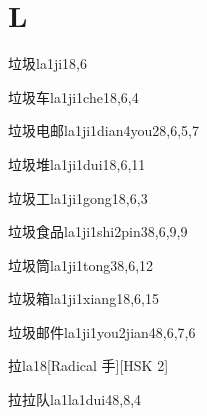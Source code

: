 
\section*{L}

\begin{entry}{垃圾}{la1ji1}{8,6}
\end{entry}

\begin{entry}{垃圾车}{la1ji1che1}{8,6,4}
\end{entry}

\begin{entry}{垃圾电邮}{la1ji1dian4you2}{8,6,5,7}
\end{entry}

\begin{entry}{垃圾堆}{la1ji1dui1}{8,6,11}
\end{entry}

\begin{entry}{垃圾工}{la1ji1gong1}{8,6,3}
\end{entry}

\begin{entry}{垃圾食品}{la1ji1shi2pin3}{8,6,9,9}
\end{entry}

\begin{entry}{垃圾筒}{la1ji1tong3}{8,6,12}
\end{entry}

\begin{entry}{垃圾箱}{la1ji1xiang1}{8,6,15}
\end{entry}

\begin{entry}{垃圾邮件}{la1ji1you2jian4}{8,6,7,6}
\end{entry}

\begin{entry}{拉}{la1}{8}[Radical 手][HSK 2]
\end{entry}

\begin{entry}{拉拉队}{la1la1dui4}{8,8,4}
\end{entry}

